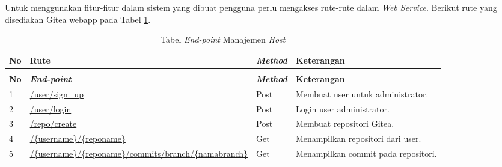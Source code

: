    		Untuk menggunakan fitur-fitur dalam sistem yang dibuat pengguna perlu mengakses rute-rute dalam \textit{Web Service}. Berikut rute yang disediakan Gitea webapp pada Tabel \ref{tabelRuteWebGitea}.
   		
   	\begin{longtable}{|p{}|p{}|p{}|p{}|}
   		
   		\caption{Tabel rute \textit{web service} pada \textit{middleware}} \label{tabelRuteWebGitea} \\
   		\hline
   		\textbf{No} & \textbf{Rute} & \textbf{\textit{Method}} & \textbf{Keterangan} \\ \hline
   		\endfirsthead
   		\caption[]{Tabel \textit{End-point} Manajemen \textit{Host}}   \\
   		\hline
   		\textbf{No} & \textbf{\textit{End-point}} & \textbf{\textit{Method}} & \textbf{Keterangan} \\ \hline
   		\endhead
   		\endfoot
   		\endlastfoot
   			
   			1 & \url{/user/sign_up} & Post & Membuat user untuk administrator. \\ \hline
			2 & \url{/user/login} & Post & Login user administrator. \\ \hline
			3 & \url{/repo/create} & Post & Membuat repositori Gitea. \\ \hline 
			4 & \url{/{username}/{reponame}} & Get & Menampilkan repositori dari user.\\ \hline
			5 & \url{/{username}/{reponame}/commits/branch/{namabranch}} & Get & Menampilkan commit pada repositori.\\ \hline		
   			
   		\end{longtable}
   	
